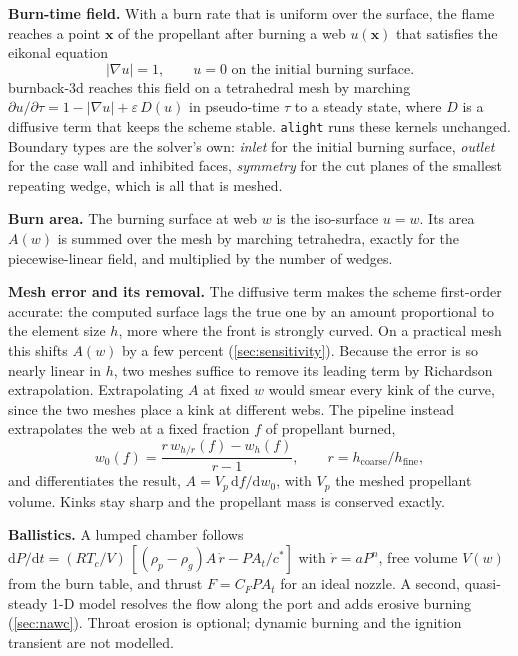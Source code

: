 \documentclass[10pt,a4paper]{article}
\begin{document}
\textbf{Burn-time field.} With a burn rate that is uniform over the surface, the flame reaches a
point $\mathbf{x}$ of the propellant after burning a web $u(\mathbf{x})$ that satisfies the eikonal
equation
\begin{equation}
  |\nabla u| = 1, \qquad u = 0 \text{ on the initial burning surface}.
\end{equation}
burnback-3d reaches this field on a tetrahedral mesh by marching
$\partial u/\partial\tau = 1 - |\nabla u| + \varepsilon\,D(u)$ in pseudo-time $\tau$ to a steady
state, where $D$ is a diffusive term that keeps the scheme stable. \texttt{alight} runs these
kernels unchanged. Boundary types are the solver's own: \emph{inlet} for the initial burning
surface, \emph{outlet} for the case wall and inhibited faces, \emph{symmetry} for the cut planes of
the smallest repeating wedge, which is all that is meshed.

\textbf{Burn area.} The burning surface at web $w$ is the iso-surface $u = w$. Its area $A(w)$ is
summed over the mesh by marching tetrahedra, exactly for the piecewise-linear field, and multiplied
by the number of wedges.

\textbf{Mesh error and its removal.} The diffusive term makes the scheme first-order accurate: the
computed surface lags the true one by an amount proportional to the element size $h$, more where
the front is strongly curved. On a practical mesh this shifts $A(w)$ by a few percent
(\cref{sec:sensitivity}). Because the error is so nearly linear in $h$, two meshes suffice to
remove its leading term by Richardson extrapolation. Extrapolating $A$ at fixed $w$ would smear
every kink of the curve, since the two meshes place a kink at different webs. The pipeline instead
extrapolates the web at a fixed fraction $f$ of propellant burned,
\begin{equation}
  w_0(f) = \frac{r\,w_{h/r}(f) - w_h(f)}{r - 1}, \qquad r = h_\text{coarse}/h_\text{fine},
\end{equation}
and differentiates the result, $A = V_p\,\mathrm{d}f/\mathrm{d}w_0$, with $V_p$ the meshed propellant
volume. Kinks stay sharp and the propellant mass is conserved exactly.

\textbf{Ballistics.} A lumped chamber follows
$\mathrm{d}P/\mathrm{d}t = (RT_c/V)\,[(\rho_p - \rho_g)A\,\dot r - P A_t/c^*]$ with
$\dot r = aP^n$, free volume $V(w)$ from the burn table, and thrust $F = C_F P A_t$ for an ideal
nozzle. A second, quasi-steady 1-D model resolves the flow along the port and adds erosive burning
(\cref{sec:nawc}). Throat erosion is optional; dynamic burning and the ignition transient are not modelled.
\end{document}

